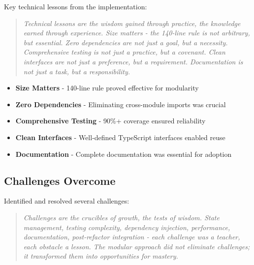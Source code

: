 \documentclass[11pt]{article}
\begin{document}
Key technical lessons from the implementation:

\begin{quote}
\emph{Technical lessons are the wisdom gained through practice, the knowledge earned through experience. Size matters - the 140-line rule is not arbitrary, but essential. Zero dependencies are not just a goal, but a necessity. Comprehensive testing is not just a practice, but a covenant. Clean interfaces are not just a preference, but a requirement. Documentation is not just a task, but a responsibility.}
\end{quote}

\begin{itemize}
\item \textbf{Size Matters} - 140-line rule proved effective for modularity
\item \textbf{Zero Dependencies} - Eliminating cross-module imports was crucial
\item \textbf{Comprehensive Testing} - 90\%+ coverage ensured reliability
\item \textbf{Clean Interfaces} - Well-defined TypeScript interfaces enabled reuse
\item \textbf{Documentation} - Complete documentation was essential for adoption
\end{itemize}

\subsection{Challenges Overcome}

Identified and resolved several challenges:

\begin{quote}
\emph{Challenges are the crucibles of growth, the tests of wisdom. State management, testing complexity, dependency injection, performance, documentation, post-refactor integration - each challenge was a teacher, each obstacle a lesson. The modular approach did not eliminate challenges; it transformed them into opportunities for mastery.}
\end{quote}
\end{document}
